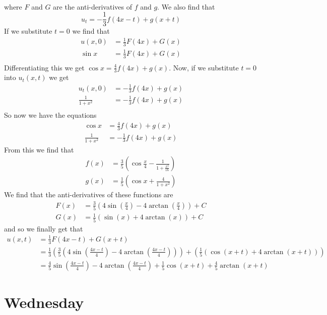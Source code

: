 \documentclass{ben}
\begin{document}
\begin{solution}
\begin{align*}
\end{align*}
where $F$ and $G$ are the anti-derivatives of $f$ and $g$.
We also find that
\[
    u_t = -\frac{1}{3} f(4x - t) + g(x + t)
\]
If we substitute $t = 0$ we find that
\begin{align*}
    u(x, 0) &= \frac{1}{3} F(4x) + G(x)\\
    \sin x &= \frac{1}{3}F(4x) + G(x)\\
\end{align*}
Differentiating this we get $\cos x = \frac{4}{3}f(4x) + g(x)$.
Now, if we substitute $t = 0$ into $u_t(x, t)$ we get
\begin{align*}
    u_t(x, 0) &= -\frac{1}{3} f(4x) + g(x)\\
    \frac{1}{1 + x^2} &= -\frac{1}{3} f(4x) + g(x)\\
\end{align*}
So now we have the equations
\begin{align*}
    \cos x &= \frac{4}{3}f(4x) + g(x)\\
    \frac{1}{1 + x^2} &= -\frac{1}{3} f(4x) + g(x)
\end{align*}
From this we find that
\begin{align*}
    f(x) &= \frac{3}{5} \left( \cos \frac{x}{4} - \frac{1}{1 + \frac{x^2}{16}} \right)\\
    g(x) &= \frac{1}{5} \left( \cos x + \frac{4}{1 + x^2} \right)
\end{align*}
We find that the anti-derivatives of these functions are
\begin{align*}
    F(x) &= \frac{3}{5} \left( 4 \sin \left( \frac{x}{4} \right)
    - 4 \arctan \left( \frac{x}{4} \right) \right) + C\\
    G(x) &= \frac{1}{5} \left( \sin(x) + 4 \arctan(x) \right) + C
\end{align*}
and so we finally get that
\begin{align*}
    u(x, t) &= \frac{1}{3} F(4x - t) + G(x + t)\\
    &= \frac{1}{3} \left( \frac{3}{5} \left( 4 \sin \left( \frac{4x - t}{4} \right)
    - 4 \arctan \left( \frac{4x - t}{4} \right) \right) \right)
    + \left( \frac{1}{5} \left( \cos (x + t) + 4 \arctan(x + t) \right) \right)\\
    &= \frac{4}{5} \sin\left( \frac{4x - t}{4} \right) - 4 \arctan \left( \frac{4x - t}{4} \right)
    + \frac{1}{5} \cos (x + t) + \frac{4}{5} \arctan(x + t)
\end{align*}
\end{solution}
\newpage
\section{Wednesday}
\end{document}
